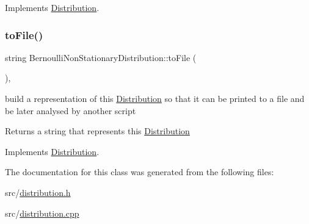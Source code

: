 Implements \mbox{\hyperlink{class_distribution_ac9c74d18549f532caa09ae86d8b25b55}{Distribution}}.

\mbox{\label{class_bernoulli_non_stationary_distribution_a5db3f4675ff988f3c775a939f8ef4847}} 
\subsubsection{\texorpdfstring{to\+File()}{toFile()}}
{\footnotesize\ttfamily string Bernoulli\+Non\+Stationary\+Distribution\+::to\+File (\begin{DoxyParamCaption}{ }\end{DoxyParamCaption})\hspace{0.3cm}{\ttfamily [override]}, {\ttfamily [virtual]}}



build a representation of this \mbox{\hyperlink{class_distribution}{Distribution}} so that it can be printed to a file and be later analysed by another script 

\begin{DoxyReturn}{Returns}
a string that represents this \mbox{\hyperlink{class_distribution}{Distribution}} 
\end{DoxyReturn}


Implements \mbox{\hyperlink{class_distribution_ac41d57a4d7f82041810f886590a236a5}{Distribution}}.



The documentation for this class was generated from the following files\+:\begin{DoxyCompactItemize}
\item 
src/\mbox{\hyperlink{distribution_8h}{distribution.\+h}}\item 
src/\mbox{\hyperlink{distribution_8cpp}{distribution.\+cpp}}\end{DoxyCompactItemize}
